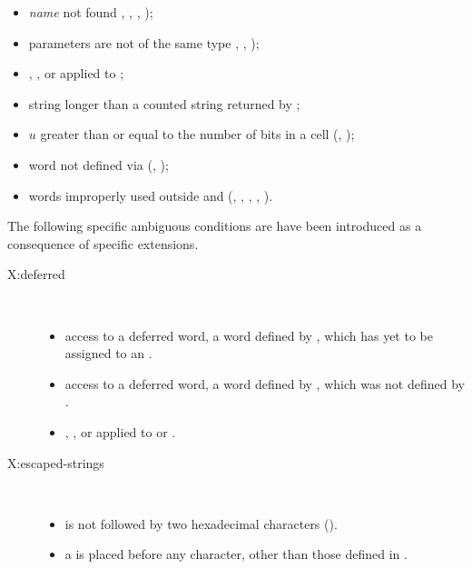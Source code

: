 \begin{itemize}
\item \emph{name} not found ,
	, ,
	);

\item parameters are not of the same type ,
	, );

\item {},
	,
	 or
	 applied to ;

\item string longer than a counted string returned by
	;

\item $u$ greater than or equal to the number of bits in a cell
	(, );

\item word not defined via 
	(, );

\item words improperly used outside
	 and 
	(, ,
	 ,
	 ,
	 ).
\end{itemize}

The following specific ambiguous conditions are have been introduced
as a consequence of specific extensions.

\begin{description}


\item[\textsf{X:deferred}] ~
	\begin{itemize}
\item access to a deferred word, a word defined by ,
	which has yet to be assigned to an .

\item access to a deferred word, a word defined by ,
	which was not defined by .

\item {}, ,
	 or  applied to 
	or .
	\end{itemize}


\item[\textsf{X:escaped-strings}]~
	\begin{itemize}
	\item {} is not followed by two hexadecimal characters ().
	\item a \bs{} is placed before any character, other than those defined in
		.
	\end{itemize}
\end{description}


